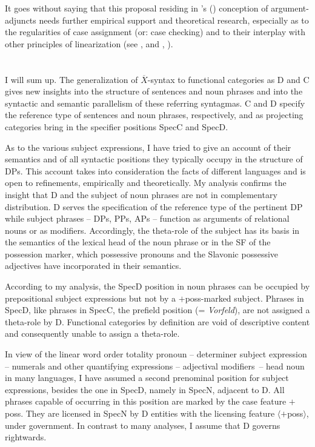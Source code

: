 \documentclass[output=paper,colorlinks,citecolor=brown]{langscibook}
\begin{document}
\noindent It goes without saying that this proposal residing in \citeauthor{Grimshaw88Adjuncts-and}'s (\citeyear{Grimshaw88Adjuncts-and}) conception of argument-adjuncts needs further empirical support and theoretical research, especially as to the regularities of case assignment (or: case checking) and to their interplay with other principles of linearization (see \citealt{Huste89Zur-Syntax, Huste89Zur-Topologie}, \citealt{Bischof91Sachverhaltsbezeichnungen-des}  and \citealt{Freytag90Die-syntaktische}, \citealt{Freytag91Sachverhaltsbezeichnungen-des}).

\section{} \label{sec:zi91:6}

I will sum up. The generalization of $\overline{X}$-syntax to functional categories as D and C gives new insights into the structure of sentences and noun phrases and into the syntactic and semantic parallelism of these referring syntagmas. C and D specify the reference type of sentences and noun phrases, respectively, and as projecting categories bring in the specifier positions SpecC and SpecD.

As to the various subject expressions, I have tried to give an account of their semantics and of all syntactic positions they typically occupy in the structure of DPs. This account takes into consideration the facts of different languages and is open to refinements, empirically and theoretically. My analysis confirms the insight that D and the subject of noun phrases are not in complementary distribution. D serves the specification of the reference type of the pertinent DP while subject phrases -- DPs, PPs, APs -- function as arguments of relational nouns or as modifiers. Accordingly, the theta-role of the subject has its basis in the semantics of the lexical head of the noun phrase or in the SF of the possession marker, which possessive pronouns and the Slavonic possessive adjectives have incorporated in their semantics.

According to my analysis, the SpecD position in noun phrases can be occupied by prepositional subject expressions but not by a $+$poss-marked subject. Phrases in SpecD, like phrases in SpecC, the prefield position (= \textit{Vorfeld}), are not assigned a theta-role by D. Functional categories by definition are void of descriptive content and consequently unable to assign a theta-role.


\largerpage
In view of the linear word order totality pronoun -- determiner subject expression -- numerals and other quantifying expressions -- adjectival modifiers~-- head noun in many languages, I have assumed a second prenominal position for subject expressions, besides the one in SpecD, namely in SpecN, adjacent to D. All phrases capable of occurring in this position are marked by the case feature $+$poss. They are licensed in SpecN by D entities with the licensing feature $\langle +$poss$\rangle$, under government. In contrast to many analyses, I assume that D governs rightwards.
\end{document}
